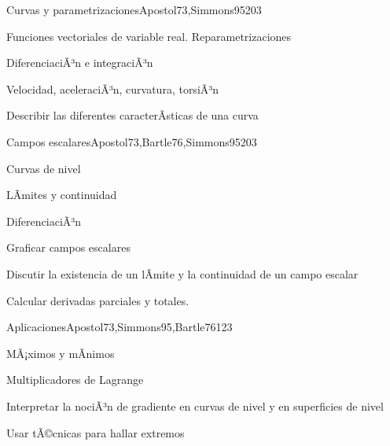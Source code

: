 \begin{syllabus}
\begin{unit}{Curvas y parametrizaciones}{Apostol73,Simmons95}{20}{3}
   \begin{topics}
      \item Funciones vectoriales de variable real. Reparametrizaciones
      \item DiferenciaciÃ³n e integraciÃ³n
      \item Velocidad, aceleraciÃ³n, curvatura, torsiÃ³n
      \end{topics}

   \begin{unitgoals}
      \item Describir las diferentes caracterÃ­sticas de una curva
      \end{unitgoals}
\end{unit}

\begin{unit}{Campos escalares}{Apostol73,Bartle76,Simmons95}{20}{3}
   \begin{topics}
      \item Curvas de nivel
      \item LÃ­mites y continuidad
      \item DiferenciaciÃ³n
      \end{topics}

   \begin{unitgoals}
      \item Graficar campos escalares
      \item Discutir la existencia de un lÃ­mite y la continuidad de un campo escalar
      \item Calcular derivadas parciales y totales.
      \end{unitgoals}
\end{unit}

\begin{unit}{Aplicaciones}{Apostol73,Simmons95,Bartle76}{12}{3}
   \begin{topics}
      \item MÃ¡ximos y mÃ­nimos
      \item Multiplicadores de Lagrange
      \end{topics}

   \begin{unitgoals}
      \item Interpretar la nociÃ³n de gradiente en curvas de nivel y en superficies de nivel
      \item Usar tÃ©cnicas para hallar extremos
      \end{unitgoals}
\end{unit}


\end{syllabus}
